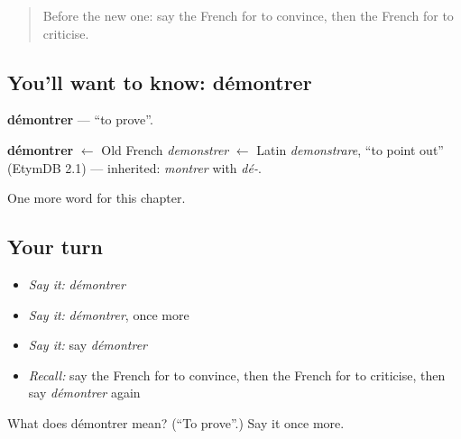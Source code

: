\label{lesson:FR-C147-demontrer}



\begin{quote}
Before the new one: say the French for to convince, then the French for to criticise.
\end{quote}

\subsection*{You'll want to know: démontrer}
\textbf{démontrer} — \textquotedblleft{}to prove\textquotedblright{}.

\begin{cousinweb}
\textbf{démontrer} $\leftarrow$ Old French \emph{demonstrer} $\leftarrow$ Latin \emph{demonstrare}, \textquotedblleft{}to point out\textquotedblright{} (EtymDB 2.1) — inherited: \emph{montrer} with \emph{dé-}.
\end{cousinweb}

\begin{grammarlens}[title={What you've built}]
One more word for this chapter.
\end{grammarlens}

\subsection*{Your turn}
\begin{itemize}
\raggedright
  \item \emph{Say it:} \emph{démontrer}
  \item \emph{Say it:} \emph{démontrer}, once more
  \item \emph{Say it:} say \emph{démontrer}
  \item \emph{Recall:} say the French for to convince, then the French for to criticise, then say \emph{démontrer} again
\end{itemize}

\begin{tcolorbox}[breakable,colback=teal!4,colframe=teal!35!black,title={Before you move on}]
What does démontrer mean? (\textquotedblleft{}To prove\textquotedblright{}.) Say it once more.
\end{tcolorbox}
